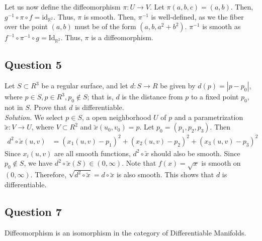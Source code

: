 \documentclass[12pt]{article}
\begin{document}
Let us now define the diffeomorphism 
$\pi : U \to V.$
Let $\pi (a, b, c) = (a, b).$ Then, $g^{-1}\circ\pi \circ f = \mathrm{id}_{\mathbb R^2}.$ Thus, $\pi$ is smooth.
Then, $\pi^{-1}$ is well-defined, as we the fiber over the point $(a, b)$ must be of the form $(a, b, a^2 + b^2).$
$\pi^{-1}$ is smooth as $f^{-1} \circ \pi^{-1} \circ g = \mathrm{Id}_{\mathbb R^2}.$ Thus, $\pi$ is a diffeomorphism.

\subsection*{Question 5}
Let $S \subset R^3$ be a regular surface, and let $d:S\to R$ be given by $d(p)=|p- p_0|$, where $p \in S, p \in R^3, p_0 \notin S$; that is, $d$ is the distance from $p$ to a fixed point $p_0$, not in $S$. Prove that $d$ is differentiable.\\

\textit{Solution.} We select $p\in S$, a open neighborhood $U$ of $p$ and a parametrization $\utilde{x}: V \to U$, where $V\subset R^2$ and $\utilde{x}(u_0,v_0) = p$. Let $p_0=(p_1,p_2,p_3)$. Then \begin{align*}
    d^2\circ\utilde{x}(u,v) &= (x_1(u,v)-p_1)^2+(x_2(u,v)-p_2)^2+(x_3(u,v)-p_3)^2
\end{align*}
Since $x_i(u,v)$ are all smooth functions, $d^2\circ \utilde{x}$ should also be smooth. Since $p_0\notin S$, we have $d^2\circ\utilde{x}(S)\in (0,\infty)$. Note that $f(x)=\sqrt{x}$ is smooth on $(0,\infty)$. Therefore, $\sqrt{d^2\circ\utilde{x}} = d\circ\utilde{x}$ is also smooth. This shows that $d$ is differentiable.

\subsection*{Question 7}

\begin{theorem} Diffeomorphism is an isomorphism in the category of Differentiable Manifolds.
\end{theorem}
\end{document}
